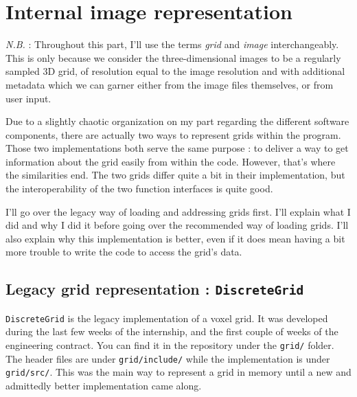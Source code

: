 \section{Internal image representation}\label{text:03_software_components:01_image_representation}
{
	\textit{N.B.} : Throughout this part, I'll use the terms \textit{grid} and \textit{image} interchangeably. This is only because we consider the three-dimensional images to be a regularly sampled 3D grid, of resolution equal to the image resolution and with additional metadata which we can garner either from the image files themselves, or from user input.

	\vspace{\baselineskip}

	Due to a slightly chaotic organization on my part regarding the different software components, there are actually two ways to represent grids within the program. Those two implementations both serve the same purpose : to deliver a way to get information about the grid easily from within the code. However, that's where the similarities end. The two grids differ quite a bit in their implementation, but the interoperability of the two function interfaces is quite good.

	\vspace{\baselineskip}

	I'll go over the legacy way of loading and addressing grids first. I'll explain what I did and why I did it before going over the recommended way of loading grids. I'll also explain why this implementation is better, even if it does mean having a bit more trouble to write the code to access the grid's data.

	\subsection{Legacy grid representation : \texttt{DiscreteGrid}}\label{text:03_software_components:01_image_representation:01_legacy_discretegrid}
	{

		\texttt{DiscreteGrid} is the legacy implementation of a voxel grid. It was developed during the last few weeks of the internship, and the first couple of weeks of the engineering contract. You can find it in the repository under the \texttt{grid/} folder. The header files are under \texttt{grid/include/} while the implementation is under \texttt{grid/src/}. This was the main way to represent a grid in memory until a new and admittedly better implementation came along.\par

}}
